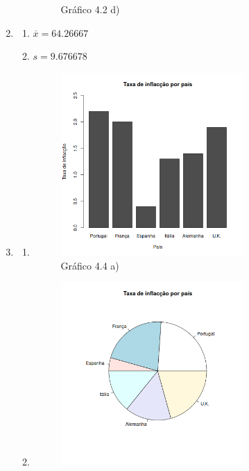 \documentclass[11pt,a4paper]{article}
\begin{document}
\begin{enumerate}[label=\arabic{section}.\arabic*]
\begin{enumerate}[label=\alph*)]
\begin{figure}[h!]
				\caption{Gráfico 4.2 d)}
			\end{figure}
			
		\end{enumerate}
	\item {}\hfill
		\begin{enumerate}[label=\alph*)]
		\item $\overline{x} = 64.26667$\hfill
			
		\item $s = 9.676678$\hfill
			
		\end{enumerate}
	\clearpage
	\item {}\hfill
		\begin{enumerate}[label=\alph*)]
		\item \hfill
			\begin{figure}[h!]
				\centering
				\includegraphics[width=0.7\textwidth]{./recursos/ex4_4a.png}
				\caption{Gráfico 4.4 a)}
			\end{figure}
			
		\clearpage
		\item \hfill
			\begin{figure}[h!]
				\centering
				\includegraphics[width=0.7\textwidth]{./recursos/ex4_4b.png}

\end{figure}
\end{enumerate}
\end{enumerate}
\end{document}
